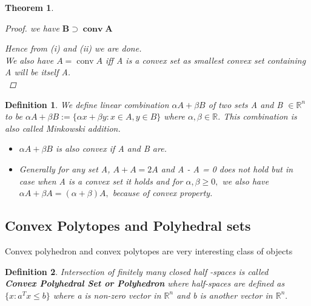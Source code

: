 \documentclass[oneside]{book}
\newtheorem{theorem}{Theorem}[section]
\newtheorem{mydef}{Definition}
\begin{document}
\begin{theorem}
\begin{proof}
we have  $ \mathbf{B} \supset \mathbf{\operatorname{conv} A}  $ \par
 Hence from (i) and (ii) we are done. \\
 We also have $A = \operatorname{conv} A$ iff A is a convex set as smallest convex set containing A will be itself A. \\

 \end{proof}
 
\end{theorem}

\begin{mydef}
We define linear combination $\alpha A+\beta B$ of two sets A and B $\in \mathbb{R}^n$ to be 
$\alpha A+\beta B:=\{\alpha x+\beta y: x \in A, y \in B\}$ where $\alpha,\beta \in \mathbb{R}$.
This combination is also called Minkowski addition.


\begin{itemize}
    \item $\alpha A+\beta B $ is also convex if A and B are. 
\item
Generally for any set A, $A +A = 2A $ and A - A = 0  does not hold but in case when A is a convex set it holds and 
 for $\alpha, \beta \geq 0,$ we also have $\alpha A+\beta A=(\alpha+\beta) A,$ because of convex property. \end{itemize}
 \end{mydef}
 
 
 
 

 
 
 
 
 
 
 
 
 
 
 
 
 
 
 
 
 
 
 
 
 
 
 
 
 
 
 
\subsection{ Convex Polytopes and Polyhedral sets }
Convex polyhedron and convex polytopes are very interesting class of objects 
\begin{mydef}

Intersection of finitely many closed half -spaces  is called \\
\textbf{ Convex Polyhedral Set  or Polyhedron}
 where half-spaces are defined as $\{ x : a^{T}x \leq b\} $  where a is non-zero vector in $\mathbb{R}^n$ and b is another vector in  $\mathbb{R}^n.$  
 
 
\end{mydef}
\end{document}
